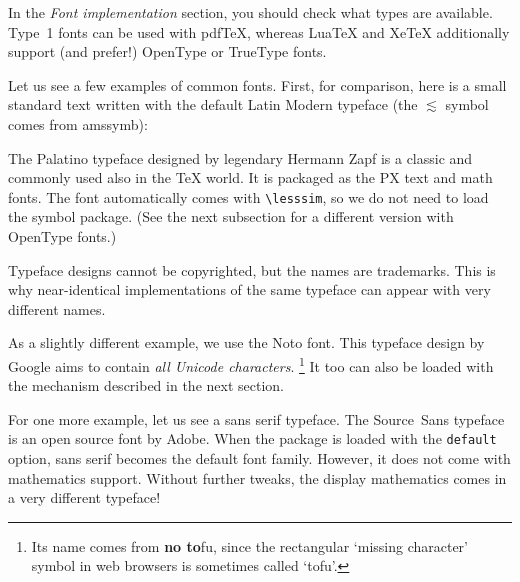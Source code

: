 In the \emph{Font implementation} section,
you should check what types are available.
Type~1 fonts can be used with pdfTeX,
whereas LuaTeX and XeTeX additionally support (and prefer!) OpenType or TrueType fonts.

Let us see a few examples of common fonts.
First, for comparison, here is a small standard text written with the default Latin Modern typeface
(the $\lesssim$ symbol comes from \textsf{amssymb}):
%

The Palatino typeface designed by legendary Hermann Zapf is a classic
and commonly used also in the \TeX{} world.
It is packaged as the PX text and math fonts.
The font automatically comes with \verb|\lesssim|, so we do not need to load the symbol package.
(See the next subsection for a different version with OpenType fonts.)
%
\begin{ExampleCode}
\usepackage{newpxtext,newpxmath}
\end{ExampleCode}
%

\begin{technote}
Typeface designs cannot be copyrighted, but the names are trademarks.
This is why near-identical implementations of the same typeface can appear with very different names.
\end{technote}

As a slightly different example, we use the Noto font.
This typeface design by Google aims to contain \emph{all Unicode characters}.%
\footnote{Its name comes from \textbf{no to}fu, since the rectangular `missing character' symbol
in web browsers is sometimes called `tofu'.}
It too can also be loaded with the mechanism described in the next section.
%
\begin{ExampleCode}
\usepackage{notomath}
\end{ExampleCode}
%

For one more example, let us see a sans serif typeface.
The Source~Sans typeface is an open source font by Adobe.
When the package is loaded with the \verb|default| option,
sans serif becomes the default font family.
However, it does not come with mathematics support.
Without further tweaks, the display mathematics comes in a very different typeface!
%
\begin{ExampleCode}
\usepackage[default]{sourcesanspro}
\usepackage{amssymb}
\end{ExampleCode}
%

